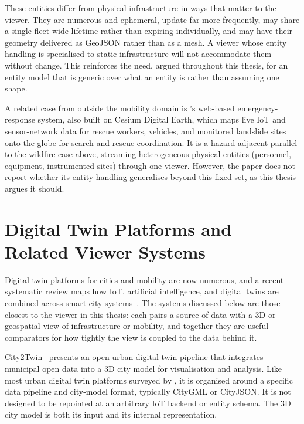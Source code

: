 These entities differ from physical infrastructure in ways that matter to the viewer. They are numerous and ephemeral, update far more frequently, may share a single fleet-wide lifetime rather than expiring individually, and may have their geometry delivered as GeoJSON rather than as a mesh. A viewer whose entity handling is specialised to static infrastructure will not accommodate them without change. This reinforces the need, argued throughout this thesis, for an entity model that is generic over what an entity is rather than assuming one shape.

A related case from outside the mobility domain is \textcite{yang2023cesiumlandslide}'s web-based emergency-response system, also built on Cesium Digital Earth, which maps live IoT and sensor-network data for rescue workers, vehicles, and monitored landslide sites onto the globe for search-and-rescue coordination. It is a hazard-adjacent parallel to the wildfire case above, streaming heterogeneous physical entities (personnel, equipment, instrumented sites) through one viewer. However, the paper does not report whether its entity handling generalises beyond this fixed set, as this thesis argues it should.

\section{Digital Twin Platforms and Related Viewer Systems}
\label{sec:related-viewer-systems}

Digital twin platforms for cities and mobility are now numerous, and a recent systematic review maps how IoT, artificial intelligence, and digital twins are combined across smart-city systems~\cite{sacoto2025smartcities}. The systems discussed below are those closest to the viewer in this thesis: each pairs a source of data with a 3D or geospatial view of infrastructure or mobility, and together they are useful comparators for how tightly the view is coupled to the data behind it.

City2Twin~\cite{rafamatanantsoa2024city2twin} presents an open urban digital twin pipeline that integrates municipal open data into a 3D city model for visualisation and analysis. Like most urban digital twin platforms surveyed by \textcite{ene2026urbandigitaltwins}, it is organised around a specific data pipeline and city-model format, typically CityGML or CityJSON. It is not designed to be repointed at an arbitrary IoT backend or entity schema. The 3D city model is both its input and its internal representation.

